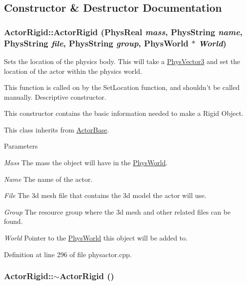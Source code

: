 \subsection{Constructor \& Destructor Documentation}
\hypertarget{classActorRigid_a8313ce86811d7233b8672f562306976c}{
\subsubsection[{ActorRigid}]{\setlength{\rightskip}{0pt plus 5cm}ActorRigid::ActorRigid (PhysReal {\em mass}, \/  PhysString {\em name}, \/  PhysString {\em file}, \/  PhysString {\em group}, \/  {\bf PhysWorld} $\ast$ {\em World})}}
\label{d5/d10/classActorRigid_a8313ce86811d7233b8672f562306976c}


Sets the location of the physics body. This will take a \hyperlink{classPhysVector3}{PhysVector3} and set the location of the actor within the physics world. \par
 This function is called on by the SetLocation function, and shouldn't be called manually. Descriptive constructor.

This constructor contains the basic information needed to make a Rigid Object. \par
 This class inherits from \hyperlink{classActorBase}{ActorBase}. 
\begin{DoxyParams}{Parameters}
\item[{\em Mass}]The mass the object will have in the \hyperlink{classPhysWorld}{PhysWorld}. \item[{\em Name}]The name of the actor. \item[{\em File}]The 3d mesh file that contains the 3d model the actor will use. \item[{\em Group}]The resource group where the 3d mesh and other related files can be found. \item[{\em World}]Pointer to the \hyperlink{classPhysWorld}{PhysWorld} this object will be added to. \end{DoxyParams}


Definition at line 296 of file physactor.cpp.\hypertarget{classActorRigid_a36b9eb18fc9e83769a48eb1c34312889}{
\subsubsection[{$\sim$ActorRigid}]{\setlength{\rightskip}{0pt plus 5cm}ActorRigid::$\sim$ActorRigid ()}}
\label{d5/d10/classActorRigid_a36b9eb18fc9e83769a48eb1c34312889}


